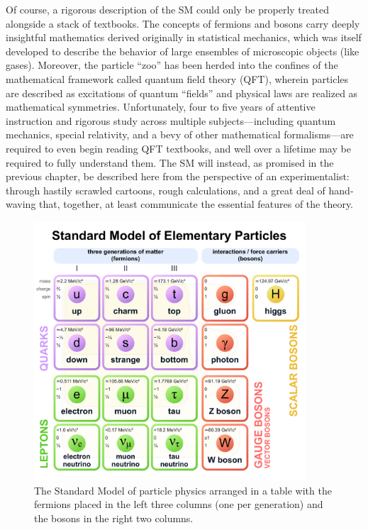Of course, a rigorous description of the SM could only be properly treated alongside a stack of textbooks. 
The concepts of fermions and bosons carry deeply insightful mathematics derived originally in statistical mechanics, which was itself developed to describe the behavior of large ensembles of microscopic objects (like gases). 
Moreover, the particle ``zoo'' has been herded into the confines of the mathematical framework called quantum field theory (QFT), wherein particles are described as excitations of quantum ``fields'' and physical laws are realized as mathematical symmetries. 
Unfortunately, four to five years of attentive instruction and rigorous study across multiple subjects---including quantum mechanics, special relativity, and a bevy of other mathematical formalisms---are required to even begin reading QFT textbooks, and well over a lifetime may be required to fully understand them\footnotemark{}. 
The SM will instead, as promised in the previous chapter, be described here from the perspective of an experimentalist: through hastily scrawled cartoons, rough calculations, and a great deal of hand-waving that, together, at least communicate the essential features of the theory. 

\begin{figure}[htb]
    \centering
    \includegraphics[width=0.9\textwidth]{fig/standard_model.pdf}
    \caption[The Standard Model of particle physics]{
        The Standard Model of particle physics arranged in a table with the fermions placed in the left three columns (one per generation) and the bosons in the right two columns.
    }
    \label{fig:standard_model}
\end{figure}

